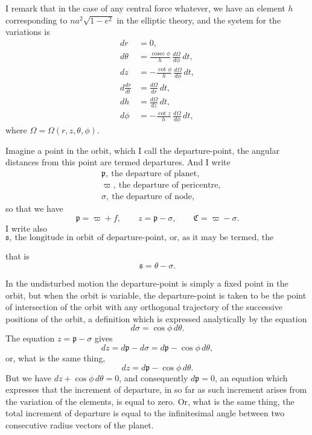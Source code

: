 \documentclass[11pt]{article}
\providecommand{\cosec}{\mathop{\mathrm{cosec}}}
\begin{document}
I remark that in the case of any central force whatever, we have an element $h$ corresponding to $na^2\sqrt{1-e^2}$ in the elliptic theory, and the system for the variations is
\begin{align*}
dr &= 0,\\
d\theta &= \frac{\cosec\phi}{h}\,\frac{d\Omega}{d\phi}\,dt,\\
dz &= -\frac{\cot\phi}{h}\,\frac{d\Omega}{d\phi}\,dt,\\
d\frac{dr}{dt} &= \frac{d\Omega}{dr}\,dt,\\
dh &= \frac{d\Omega}{dz}\,dt,\\
d\phi &= -\frac{\cot z}{h}\,\frac{d\Omega}{d\phi}\,dt,
\end{align*}
where $\Omega = \Omega(r,z,\theta,\phi)$.

\medskip

Imagine a point in the orbit, which I call the departure-point, the angular distances from this point are termed departures. And I write
\begin{align*}
& \mathfrak{p},\ \text{the departure of planet,}\\
& \varpi,\ \text{the departure of pericentre,}\\
& \sigma,\ \text{the departure of node,}
\end{align*}
so that we have
\[
\mathfrak{p} = \varpi + f, \qquad z = \mathfrak{p} - \sigma, \qquad \mathfrak{C} = \varpi - \sigma.
\]
I write also
\[
\mathfrak{s},\ \text{the longitude in orbit of departure-point, or, as it may be termed, the adjustment;}
\]

\begin{center}
\end{center}

that is
\[
\mathfrak{s} = \theta - \sigma.
\]

In the undisturbed motion the departure-point is simply a fixed point in the orbit, but when the orbit is variable, the departure-point is taken to be the point of intersection of the orbit with any orthogonal trajectory of the successive positions of the orbit, a definition which is expressed analytically by the equation
\[
d\sigma = \cos\phi\,d\theta.
\]
The equation $z = \mathfrak{p} - \sigma$ gives
\[
dz = d\mathfrak{p} - d\sigma = d\mathfrak{p} - \cos\phi\,d\theta,
\]
or, what is the same thing,
\[
dz = d\mathfrak{p} - \cos\phi\,d\theta.
\]
But we have $dz + \cos\phi\,d\theta = 0$, and consequently $d\mathfrak{p} = 0$, an equation which expresses that the increment of departure, in so far as such increment arises from the variation of the elements, is equal to zero. Or, what is the same thing, the total increment of departure is equal to the infinitesimal angle between two consecutive radius vectors of the planet.
\end{document}
